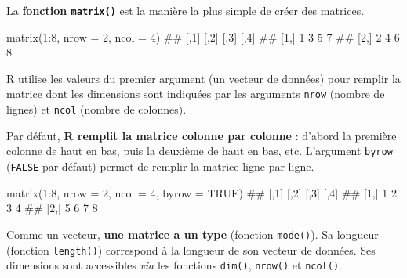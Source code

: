 \documentclass[12pt,twosided, notitlepage]{book}
\newenvironment{Shaded}{}{}
\newcommand{\KeywordTok}[1]{\textcolor[rgb]{0.00,0.00,1.00}{#1}}
\newcommand{\DataTypeTok}[1]{#1}
\newcommand{\DecValTok}[1]{#1}
\newcommand{\OtherTok}[1]{\textcolor[rgb]{1.00,0.25,0.00}{#1}}
\newcommand{\OperatorTok}[1]{#1}
\newcommand{\NormalTok}[1]{#1}
\renewenvironment{Shaded}{\begin{snugshade}}{\end{snugshade}}
\begin{document}
La \textbf{fonction \texttt{matrix()}} est
la manière la plus simple de créer des matrices.

\begin{Shaded}
\begin{Highlighting}[]
\KeywordTok{matrix}\NormalTok{(}\DecValTok{1}\OperatorTok{:}\DecValTok{8}\NormalTok{, }\DataTypeTok{nrow =} \DecValTok{2}\NormalTok{, }\DataTypeTok{ncol =} \DecValTok{4}\NormalTok{)}
\NormalTok{  ##      [,1] [,2] [,3] [,4]}
\NormalTok{  ## [1,]    1    3    5    7}
\NormalTok{  ## [2,]    2    4    6    8}
\end{Highlighting}
\end{Shaded}

R utilise les valeurs du premier argument (un vecteur de données) pour
remplir la matrice dont les dimensions sont indiquées par les arguments
\texttt{nrow} (nombre de lignes) et \texttt{ncol} (nombre de colonnes).

Par défaut, \textbf{R remplit la matrice colonne par colonne} : d'abord
la première colonne de haut en bas, puis la deuxième de haut en bas,
etc. L'argument \texttt{byrow} (\texttt{FALSE} par défaut) permet de
remplir la matrice ligne par ligne.

\begin{Shaded}
\begin{Highlighting}[]
\KeywordTok{matrix}\NormalTok{(}\DecValTok{1}\OperatorTok{:}\DecValTok{8}\NormalTok{, }\DataTypeTok{nrow =} \DecValTok{2}\NormalTok{, }\DataTypeTok{ncol =} \DecValTok{4}\NormalTok{, }\DataTypeTok{byrow =} \OtherTok{TRUE}\NormalTok{)}
\NormalTok{  ##      [,1] [,2] [,3] [,4]}
\NormalTok{  ## [1,]    1    2    3    4}
\NormalTok{  ## [2,]    5    6    7    8}
\end{Highlighting}
\end{Shaded}

Comme un vecteur, \textbf{une matrice a un type} (fonction
\texttt{mode()}). Sa longueur (fonction
\texttt{length()}) correspond à la longueur de
son vecteur de données. Ses dimensions sont accessibles \emph{via} les
fonctions \texttt{dim()},
\texttt{nrow()} et
\texttt{ncol()}.
\end{document}
